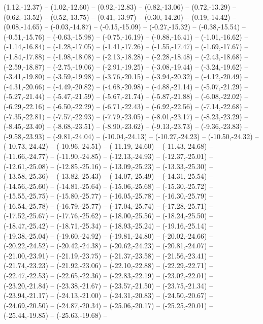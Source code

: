 {  (1.12,-12.37) -- (1.02,-12.60) -- (0.92,-12.83) -- (0.82,-13.06) -- (0.72,-13.29) -- (0.62,-13.52) -- (0.52,-13.75) --
  (0.41,-13.97) -- (0.30,-14.20) -- (0.19,-14.42) -- (0.08,-14.65) -- (-0.03,-14.87) -- (-0.15,-15.09) -- (-0.27,-15.32) --
  (-0.38,-15.54) -- (-0.51,-15.76) -- (-0.63,-15.98) -- (-0.75,-16.19) -- (-0.88,-16.41) -- (-1.01,-16.62) -- (-1.14,-16.84) --
  (-1.28,-17.05) -- (-1.41,-17.26) -- (-1.55,-17.47) -- (-1.69,-17.67) -- (-1.84,-17.88) -- (-1.98,-18.08) -- (-2.13,-18.28) --
  (-2.28,-18.48) -- (-2.43,-18.68) -- (-2.59,-18.87) -- (-2.75,-19.06) -- (-2.91,-19.25) -- (-3.08,-19.44) -- (-3.24,-19.62) --
  (-3.41,-19.80) -- (-3.59,-19.98) -- (-3.76,-20.15) -- (-3.94,-20.32) -- (-4.12,-20.49) -- (-4.31,-20.66) -- (-4.49,-20.82) --
  (-4.68,-20.98) -- (-4.88,-21.14) -- (-5.07,-21.29) -- (-5.27,-21.44) -- (-5.47,-21.59) -- (-5.67,-21.74) -- (-5.87,-21.88) --
  (-6.08,-22.02) -- (-6.29,-22.16) -- (-6.50,-22.29) -- (-6.71,-22.43) -- (-6.92,-22.56) -- (-7.14,-22.68) -- (-7.35,-22.81) --
  (-7.57,-22.93) -- (-7.79,-23.05) -- (-8.01,-23.17) -- (-8.23,-23.29) -- (-8.45,-23.40) -- (-8.68,-23.51) -- (-8.90,-23.62) --
  (-9.13,-23.73) -- (-9.36,-23.83) -- (-9.58,-23.93) -- (-9.81,-24.04) -- (-10.04,-24.13) -- (-10.27,-24.23) -- (-10.50,-24.32) --
  (-10.73,-24.42) -- (-10.96,-24.51) -- (-11.19,-24.60) -- (-11.43,-24.68) -- (-11.66,-24.77) -- (-11.90,-24.85) -- (-12.13,-24.93) --
  (-12.37,-25.01) -- (-12.61,-25.08) -- (-12.85,-25.16) -- (-13.09,-25.23) -- (-13.33,-25.30) -- (-13.58,-25.36) -- (-13.82,-25.43) --
  (-14.07,-25.49) -- (-14.31,-25.54) -- (-14.56,-25.60) -- (-14.81,-25.64) -- (-15.06,-25.68) -- (-15.30,-25.72) -- (-15.55,-25.75) --
  (-15.80,-25.77) -- (-16.05,-25.78) -- (-16.30,-25.79) -- (-16.54,-25.78) -- (-16.79,-25.77) -- (-17.04,-25.74) -- (-17.28,-25.71) --
  (-17.52,-25.67) -- (-17.76,-25.62) -- (-18.00,-25.56) -- (-18.24,-25.50) -- (-18.47,-25.42) -- (-18.71,-25.34) -- (-18.93,-25.24) --
  (-19.16,-25.14) -- (-19.38,-25.04) -- (-19.60,-24.92) -- (-19.81,-24.80) -- (-20.02,-24.66) -- (-20.22,-24.52) -- (-20.42,-24.38) --
  (-20.62,-24.23) -- (-20.81,-24.07) -- (-21.00,-23.91) -- (-21.19,-23.75) -- (-21.37,-23.58) -- (-21.56,-23.41) -- (-21.74,-23.23) --
  (-21.92,-23.06) -- (-22.10,-22.88) -- (-22.29,-22.71) -- (-22.47,-22.53) -- (-22.65,-22.36) -- (-22.83,-22.19) -- (-23.02,-22.01) --
  (-23.20,-21.84) -- (-23.38,-21.67) -- (-23.57,-21.50) -- (-23.75,-21.34) -- (-23.94,-21.17) -- (-24.13,-21.00) -- (-24.31,-20.83) --
  (-24.50,-20.67) -- (-24.69,-20.50) -- (-24.87,-20.34) -- (-25.06,-20.17) -- (-25.25,-20.01) -- (-25.44,-19.85) -- (-25.63,-19.68) --
}

